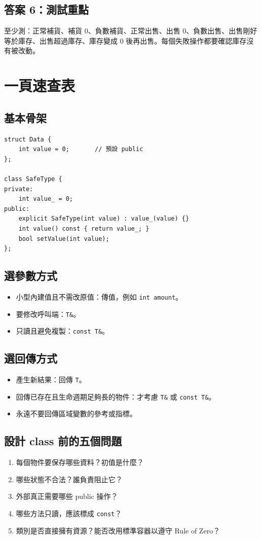 \documentclass[11pt,a4paper]{article}
\newcommand{\code}[1]{\texttt{#1}}
\begin{document}
\subsection*{答案 6：測試重點}
至少測：正常補貨、補貨 0、負數補貨、正常出售、出售 0、負數出售、出售剛好等於庫存、出售超過庫存、庫存變成 0 後再出售。每個失敗操作都要確認庫存沒有被改動。

\section{一頁速查表}

\subsection*{基本骨架}
\begin{lstlisting}
struct Data {
    int value = 0;       // 預設 public
};

class SafeType {
private:
    int value_ = 0;
public:
    explicit SafeType(int value) : value_(value) {}
    int value() const { return value_; }
    bool setValue(int value);
};
\end{lstlisting}

\subsection*{選參數方式}
\begin{itemize}
  \item 小型內建值且不需改原值：傳值，例如 \code{int amount}。
  \item 要修改呼叫端：\code{T\&}。
  \item 只讀且避免複製：\code{const T\&}。
\end{itemize}

\subsection*{選回傳方式}
\begin{itemize}
  \item 產生新結果：回傳 \code{T}。
  \item 回傳已存在且生命週期足夠長的物件：才考慮 \code{T\&} 或 \code{const T\&}。
  \item 永遠不要回傳區域變數的參考或指標。
\end{itemize}

\subsection*{設計 class 前的五個問題}
\begin{enumerate}
  \item 每個物件要保存哪些資料？初值是什麼？
  \item 哪些狀態不合法？誰負責阻止它？
  \item 外部真正需要哪些 public 操作？
  \item 哪些方法只讀，應該標成 \code{const}？
  \item 類別是否直接擁有資源？能否改用標準容器以遵守 Rule of Zero？
\end{enumerate}
\end{document}
